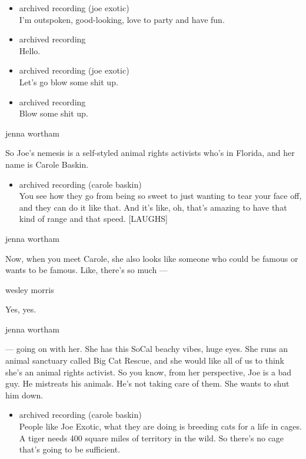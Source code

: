 \begin{itemize}
\item
  archived recording (joe exotic)\\
  I'm outspoken, good-looking, love to party and have fun.
\item
  archived recording\\
  Hello.
\item
  archived recording (joe exotic)\\
  Let's go blow some shit up.
\item
  archived recording\\
  Blow some shit up.
\end{itemize}

jenna wortham

So Joe's nemesis is a self-styled animal rights activists who's in
Florida, and her name is Carole Baskin.

\begin{itemize}
\tightlist
\item
  archived recording (carole baskin)\\
  You see how they go from being so sweet to just wanting to tear your
  face off, and they can do it like that. And it's like, oh, that's
  amazing to have that kind of range and that speed. {[}LAUGHS{]}
\end{itemize}

jenna wortham

Now, when you meet Carole, she also looks like someone who could be
famous or wants to be famous. Like, there's so much ---

wesley morris

Yes, yes.

jenna wortham

--- going on with her. She has this SoCal beachy vibes, huge eyes. She
runs an animal sanctuary called Big Cat Rescue, and she would like all
of us to think she's an animal rights activist. So you know, from her
perspective, Joe is a bad guy. He mistreats his animals. He's not taking
care of them. She wants to shut him down.

\begin{itemize}
\tightlist
\item
  archived recording (carole baskin)\\
  People like Joe Exotic, what they are doing is breeding cats for a
  life in cages. A tiger needs 400 square miles of territory in the
  wild. So there's no cage that's going to be sufficient.
\end{itemize}

